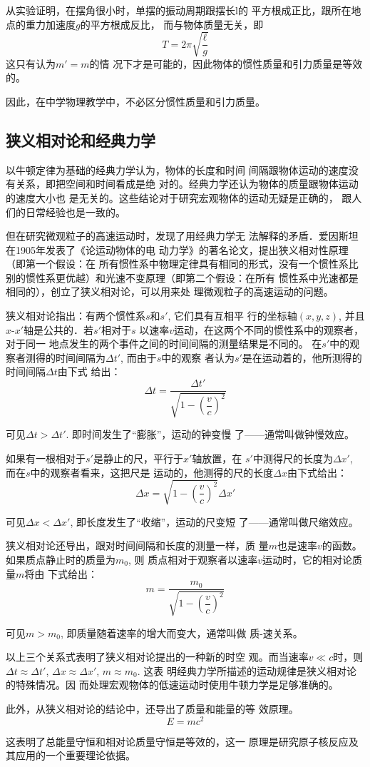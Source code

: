 从实验证明，在摆角很小时，单摆的振动周期跟摆长l的
平方根成正比，跟所在地点的重力加速度$g$的平方根成反比，
而与物体质量无关，即
$$T=2\pi\sqrt{\frac{\ell}{g}}$$
这只有认为$m'=m$的情
况下才是可能的，因此物体的惯性质量和引力质量是等效的。

因此，在中学物理教学中，不必区分惯性质量和引力质量。


\subsection{狭义相对论和经典力学}
以牛顿定律为基础的经典力学认为，物体的长度和时间
间隔跟物体运动的速度没有关系，即把空间和时间看成是绝
对的。经典力学还认为物体的质量跟物体运动的速度大小也
是无关的。这些结论对于研究宏观物体的运动无疑是正确的，
跟人们的日常经验也是一致的。

但在研究微观粒子的高速运动时，发现了用经典力学无
法解释的矛盾．爱因斯坦在1905年发表了《论运动物体的电
动力学》的著名论文，提出狭义相对性原理（即第一个假设：在
所有惯性系中物理定律具有相同的形式，没有一个惯性系比
别的惯性系更优越）和光速不变原理（即第二个假设：在所有
惯性系中光速都是相同的），创立了狭义相对论，可以用来处
理微观粒子的高速运动的问题。

狭义相对论指出：有两个惯性系$s$和$s'$, 它们具有互相平
行的坐标轴$(x,y,z)$, 并且$x$-$x'$轴是公共的．若$s'$相对于$s$
以速率$v$运动，在这两个不同的惯性系中的观察者，对于同一
地点发生的两个事件之间的时间间隔的测量结果是不同的。
在$s'$中的观察者测得的时间间隔为$\Delta t'$, 而由于$s$中的观察
者认为$s'$是在运动着的，他所测得的时间间隔$\Delta t$由下式
给出：
\[\Delta t=\frac{\Delta t'}{\sqrt{1-\left(\dfrac{v}{c}\right)^2}}\]

可见$\Delta t>\Delta t'$. 即时间发生了“膨胀”，运动的钟变慢
了——通常叫做钟慢效应。

如果有一根相对于$s'$是静止的尺，平行于$x'$轴放置，在
$s'$中测得尺的长度为$\Delta x'$, 而在$s$中的观察者看来，这把尺是
运动的，他测得的尺的长度$\Delta x$由下式给出：
\[\Delta x={\sqrt{1-\left(\dfrac{v}{c}\right)^2}}\Delta x'\]

可见$\Delta x<\Delta x'$, 即长度发生了“收缩”，运动的尺变短
了——通常叫做尺缩效应。

狭义相对论还导出，跟对时间间隔和长度的测量一样，质
量$m$也是速率$v$的函数。如果质点静止时的质量为$m_0$, 则
质点相对于观察者以速率$v$运动时，它的相对论质量$m$将由
下式给出：
\[m=\frac{m_0}{\sqrt{1-\left(\dfrac{v}{c}\right)^2}}\]

可见$m>m_0$, 即质量随着速率的增大而变大，通常叫做
质-速关系。

以上三个关系式表明了狭义相对论提出的一种新的时空
观。而当速率$v\ll c$时，则$\Delta t\approx \Delta t'$, $\Delta x\approx \Delta x'$, $m\approx m_0$. 这表
明经典力学所描述的运动规律是狭义相对论的特殊情况。因
而处理宏观物体的低速运动时使用牛顿力学是足够准确的。

此外，从狭义相对论的结论中，还导出了质量和能量的等
效原理。
\[E=mc^2\]

这表明了总能量守恒和相对论质量守恒是等效的，这一
原理是研究原子核反应及其应用的一个重要理论依据。
